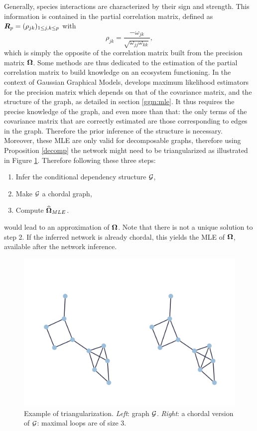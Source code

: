 Generally, species interactions are characterized by their sign and strength. This information is contained in  the partial correlation matrix, defined as ${\boldsymbol{R}}_p=(\rho_{jk})_{1\leq j,k\leq p}$ with $$\rho_{jk}=\frac{-\omega_{jk}}{\sqrt{\omega_{jj}\omega_{kk}}},$$
 which is simply the opposite of the correlation matrix built from the precision matrix ${\boldsymbol{\Omega}}$. Some methods are thus dedicated to the estimation of the partial correlation matrix to build knowledge on an ecosystem functioning. In the context of Gaussian Graphical Models, \cite{Lau96} develops maximum likelihood estimators for the precision matrix which depends on that of the covariance matrix, and the structure of the graph, as detailed in section \ref{ggm:mle}. It thus requires the precise knowledge of the graph, and even more than that: the only terms of the covariance matrix that are correctly estimated are those corresponding to edges in the graph. Therefore the prior inference of the structure is necessary. Moreover, these MLE are only valid for decomposable graphs, therefore using Proposition \ref{decomp} the network might need to be triangularized as illustrated in Figure \ref{chordal}. Therefore following these three steps: 
\begin{enumerate}
\item Infer the conditional dependency structure $\mathcal{G}$,
\item Make $\mathcal{G}$ a chordal graph,
\item Compute $\widehat{{\boldsymbol{\Omega}}}_{MLE}$.
\end{enumerate}
 would lead to an approximation of ${\boldsymbol{\Omega}}$. Note that there is not a unique solution to step 2.  If the inferred network is already chordal, this  yields  the MLE of ${\boldsymbol{\Omega}}$, available after the network inference.

\begin{figure}
\centering
\includegraphics[width = 0.6\linewidth]{figs/chordal.png}
\caption{Example of triangularization. \textit{Left}:  graph $\mathcal{G}$. \textit{Right}: a chordal version of $\mathcal{G}$: maximal loops are of size 3.}
\label{chordal}
\end{figure}

